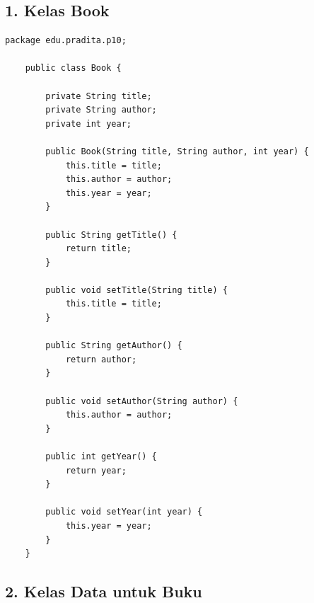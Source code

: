 \subsection{1. Kelas Book}

\begin{lstlisting}[style=JavaStyle]
	package edu.pradita.p10;
	
	public class Book {
		
		private String title;
		private String author;
		private int year;
		
		public Book(String title, String author, int year) {
			this.title = title;
			this.author = author;
			this.year = year;
		}
		
		public String getTitle() {
			return title;
		}
		
		public void setTitle(String title) {
			this.title = title;
		}
		
		public String getAuthor() {
			return author;
		}
		
		public void setAuthor(String author) {
			this.author = author;
		}
		
		public int getYear() {
			return year;
		}
		
		public void setYear(int year) {
			this.year = year;
		}
	}
\end{lstlisting}

\subsection{2. Kelas Data untuk Buku}

